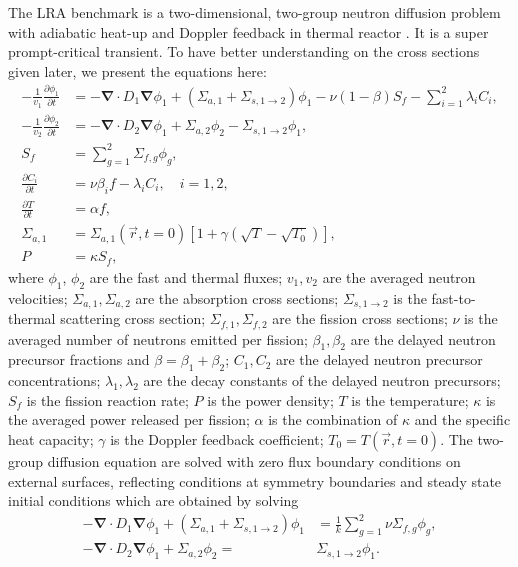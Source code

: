 \documentclass[12pt]{scrartcl}
\renewcommand{\div}{\bs{\nabla}\! \cdot \!}
\newcommand{\grad}{\bs{\nabla}}
\newcommand{\bs}[1]{\mathbf{#1}}
\begin{document}
The LRA benchmark is a two-dimensional, two-group neutron diffusion problem with adiabatic heat-up and Doppler feedback in thermal reactor \cite{ANL_BPB}.  It is a super prompt-critical transient.  To have better understanding on the cross sections given later, we present the equations here:
\begin{subequations}
\begin{align}
-\frac{1}{v_1} \frac{\partial \phi_1}{\partial t} &= -\div D_1 \grad\phi_1 + (\Sigma_{a,1} + \Sigma_{s, 1\rightarrow 2})\phi_1 - \nu(1-\beta)S_f  - \sum_{i=1}^2 \lambda_i C_i, \\
-\frac{1}{v_2} \frac{\partial \phi_2}{\partial t} &= -\div D_2 \grad\phi_1 + \Sigma_{a,2}\phi_2 - \Sigma_{s, 1\rightarrow 2}\phi_1, \\
S_f &= \sum_{g=1}^2 \Sigma_{f,g} \phi_g, \\
\frac{\partial C_i}{\partial t} &= \nu\beta_i f - \lambda_i C_i, \quad i=1,2, \\
\frac{\partial T}{\partial t} &= \alpha f, \label{eq:lra-temp} \\
\Sigma_{a,1} &= \Sigma_{a,1}(\vec{r}, t=0) \left[1+\gamma\left(\sqrt{T} - \sqrt{T_0}\right)\right], \\
P &= \kappa S_f,
\end{align}
\end{subequations}
where $\phi_1$, $\phi_2$ are the fast and thermal fluxes; $v_1, v_2$ are the averaged neutron velocities; $\Sigma_{a,1}, \Sigma_{a,2}$ are the absorption cross sections; $\Sigma_{s,1\rightarrow 2}$ is the fast-to-thermal scattering cross section; $\Sigma_{f,1}, \Sigma_{f,2}$ are the fission cross sections; $\nu$ is the averaged number of neutrons emitted per fission; $\beta_1, \beta_2$ are the delayed neutron precursor fractions and $\beta=\beta_1 + \beta_2$; $C_1, C_2$ are the delayed neutron precursor concentrations; $\lambda_1, \lambda_2$ are the decay constants of the delayed neutron precursors; $S_f$ is the fission reaction rate; $P$ is the power density; $T$ is the temperature; $\kappa$ is the averaged power released per fission; $\alpha$ is the combination of $\kappa$ and the specific heat capacity; $\gamma$ is the Doppler feedback coefficient; $T_0=T(\vec{r}, t=0)$.
The two-group diffusion equation are solved with zero flux boundary conditions on external surfaces, reflecting conditions at symmetry boundaries and steady state initial conditions which are obtained by solving
\begin{align}
-\div D_1 \grad\phi_1 + (\Sigma_{a,1} + \Sigma_{s, 1\rightarrow 2})\phi_1 &= \frac{1}{k}\sum_{g=1}^2 \nu\Sigma_{f,g}\phi_g, \\
-\div D_2 \grad\phi_1 + \Sigma_{a,2}\phi_2 =& \Sigma_{s, 1\rightarrow 2}\phi_1. \\
\end{align}
\end{document}
